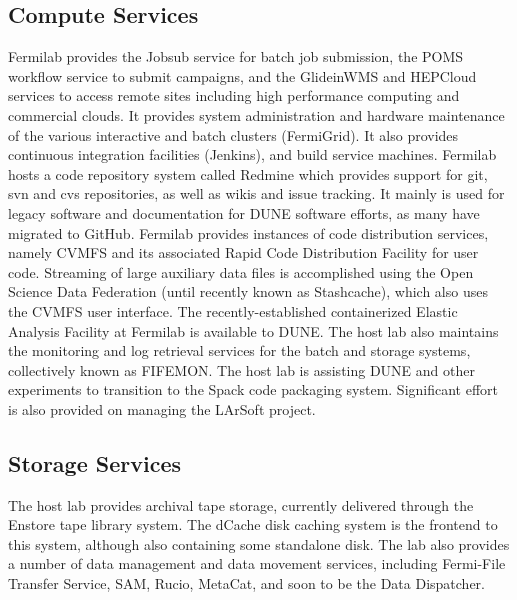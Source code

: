 \documentclass[../main-v1.tex]{subfiles}
\begin{document}

\subsection{Compute Services}
Fermilab provides the Jobsub service for batch job submission, the POMS workflow service to submit campaigns, and the GlideinWMS
and HEPCloud services to access remote sites including high performance computing and commercial clouds. It provides system administration and hardware maintenance of the various interactive and batch clusters (FermiGrid).  It also provides
continuous integration facilities (Jenkins), and build service machines.  Fermilab hosts a code repository system called Redmine which provides support for git, svn and cvs repositories, as well as wikis and issue tracking.  It mainly is used for legacy software and documentation for DUNE software efforts, as many have migrated to GitHub.  Fermilab provides instances of code distribution services, namely CVMFS and its associated Rapid Code Distribution Facility for user code.  Streaming of large auxiliary data files is accomplished using the Open Science Data Federation (until recently known as 
Stashcache), which also uses the CVMFS user interface. 
The recently-established containerized Elastic Analysis Facility at Fermilab is available to DUNE.  The host lab also maintains
the monitoring and log retrieval services for the batch and storage systems, collectively known as FIFEMON.  The host lab is assisting DUNE and other experiments to transition to the Spack code packaging system.  Significant effort is also provided on managing the LArSoft project.

\subsection{Storage Services}
The host lab provides archival tape storage, currently delivered through the Enstore tape library system.  The dCache 
disk caching system is the frontend to this system, although also containing some standalone disk.  The lab also provides a number of data management and data movement services, including Fermi-File Transfer Service, SAM, Rucio, MetaCat, and soon to be the Data Dispatcher. 

\end{document}
